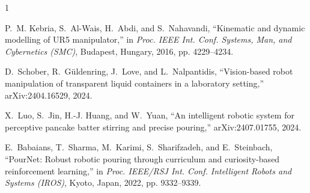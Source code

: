 \documentclass[conference]{IEEEtran}
\begin{document}
\begin{thebibliography}{1}

    P.~M. Kebria, S.~Al-Wais, H.~Abdi, and S.~Nahavandi, ``Kinematic and dynamic modelling of UR5 manipulator,'' in \emph{Proc. IEEE Int. Conf. Systems, Man, and Cybernetics (SMC)}, Budapest, Hungary, 2016, pp. 4229--4234.

    D.~Schober, R.~G{\"u}ldenring, J.~Love, and L.~Nalpantidis, ``Vision-based robot manipulation of transparent liquid containers in a laboratory setting,'' arXiv:2404.16529, 2024.

    X.~Luo, S.~Jin, H.-J. Huang, and W.~Yuan, ``An intelligent robotic system for perceptive pancake batter stirring and precise pouring,'' arXiv:2407.01755, 2024.

    E.~Babaians, T.~Sharma, M.~Karimi, S.~Sharifzadeh, and E.~Steinbach, ``PourNet: Robust robotic pouring through curriculum and curiosity-based reinforcement learning,'' in \emph{Proc. IEEE/RSJ Int. Conf. Intelligent Robots and Systems (IROS)}, Kyoto, Japan, 2022, pp. 9332--9339.

\end{thebibliography}
\end{document}
